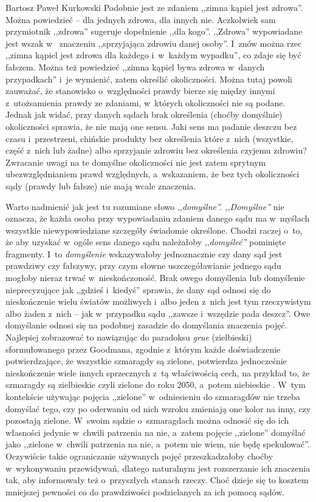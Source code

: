 \begin{artplenv}{Bartosz Paweł Kurkowski}
Podobnie jest ze zdaniem ,,zimna kąpiel jest zdrowa''. Można powiedzieć -- dla jednych zdrowa, dla innych nie. Aczkolwiek
sam przymiotnik ,,zdrowa'' sugeruje dopełnienie ,,dla kogo''. ,,Zdrowa'' wypowiadane jest wszak w~ znaczeniu ,,sprzyjająca
zdrowiu danej osoby''. I~znów można rzec ,,zimna kąpiel jest zdrowa dla każdego i~w~każdym wypadku'', co zdaje się być
fałszem. Można też powiedzieć ,,zimna kąpiel bywa zdrowa w~danych przypadkach'' i~je wymienić, zatem określić
okoliczności. Można tutaj powoli zauważać, że stanowisko o~względności prawdy bierze się między innymi z~utożsamienia
prawdy ze zdaniami, w~których okoliczności nie są podane. Jednak jak widać, przy danych sądach brak określenia (choćby
domyślnie) okoliczności sprawia, że nie mają one sensu. Jaki sens ma padanie deszczu bez czasu i~przestrzeni, chińskie
produkty bez określenia które z~nich (wszystkie, część z~nich lub żadne) albo sprzyjanie zdrowiu bez określenia czyjemu
zdrowiu? Zwracanie uwagi na te domyślne okoliczności nie jest zatem sprytnym ubezwzględnianiem prawd
względnych, a~wskazaniem, że bez tych okoliczności sądy (prawdy lub fałsze) nie mają wcale znaczenia.


Warto nadmienić jak jest tu rozumiane słowo ,,\textit{domyślne''.} \textit{,,Domyślne''} nie oznacza, że każda osoba przy
wypowiadaniu zdaniem danego sądu ma w~myślach wszystkie niewypowiedziane szczegóły świadomie określone. Chodzi
raczej o~to, że aby uzyskać w~ogóle sens danego sądu należałoby ,,\textit{domyśleć'' }pominięte fragmenty.
I~to \textit{domyślenie}
wskazywałoby jednoznacznie czy dany sąd jest prawdziwy czy fałszywy, przy czym słowne uszczegóławianie jednego sądu
mogłoby nieraz trwać w~nieskończoność. Brak owego domyślenia lub domyślenie nieprecyzujące jak ,,gdzieś i~kiedyś''
sprawia, że dany sąd odnosi się do nieskończenie wielu światów możliwych i~albo jeden z~nich jest tym rzeczywistym albo
żaden z~nich -- jak w~przypadku sądu ,,zawsze i~wszędzie pada deszcz''. Owe domyślanie odnosi się na podobnej zasadzie do
domyślania znaczenia pojęć. Najlepiej zobrazować to nawiązując do paradoksu \textit{grue }(zielbieski) sformułowanego
przez Goodmana, zgodnie z~którym każde doświadczenie potwierdzające, że wszystkie szmaragdy są zielone, potwierdza
jednocześnie nieskończenie wiele innych sprzecznych z~tą właściwością cech, na przykład to, że szmaragdy są zielbieskie
czyli zielone do roku 2050, a~potem niebieskie
\parencite[s.~68]{grobler_prawda_2000}.
W~tym kontekście
używając pojęcia ,,zielone'' w~odniesieniu do szmaragdów nie trzeba domyślać tego, czy po oderwaniu od nich wzroku
zmieniają one kolor na inny, czy pozostają zielone. W~swoim sądzie o~szmaragdach można odnosić się do ich własności
jedynie w~chwili patrzenia na nie, a~zatem pojęcie ,,zielone'' domyślać jako ,,zielone w~chwili patrzenia na
nie, a~potem nie wiem, nie będę spekulować''. Oczywiście takie ograniczanie używanych pojęć przeszkadzałoby
choćby w~wykonywaniu
przewidywań, dlatego naturalnym jest rozszerzanie ich znaczenia tak, aby informowały też o~przyszłych stanach rzeczy.
Choć dzieje się to kosztem mniejszej pewności co do prawdziwości podzielanych za ich pomocą sądów.



\end{artplenv}
